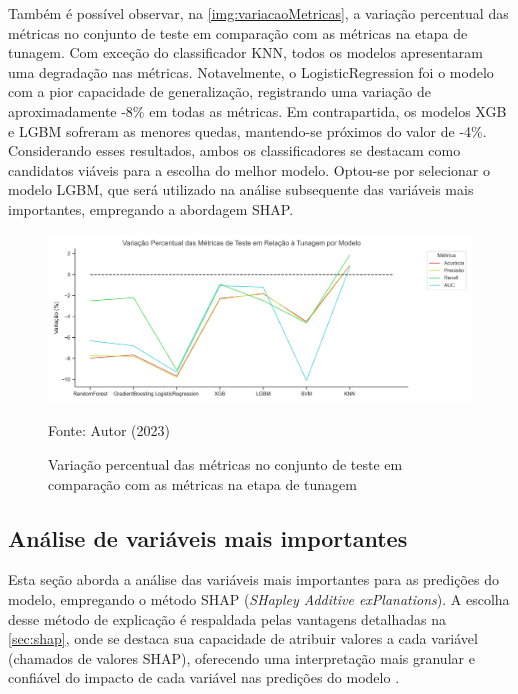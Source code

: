 Também é possível observar, na \autoref{img:variacaoMetricas}, a variação percentual das métricas no conjunto de teste em comparação com as métricas na etapa de tunagem. Com exceção do classificador KNN, todos os modelos apresentaram uma degradação nas métricas. Notavelmente, o LogisticRegression foi o modelo com a pior capacidade de generalização, registrando uma variação de aproximadamente -8\% em todas as métricas. Em contrapartida, os modelos XGB e LGBM sofreram as menores quedas, mantendo-se próximos do valor de -4\%. Considerando esses resultados, ambos os classificadores se destacam como candidatos viáveis para a escolha do melhor modelo. Optou-se por selecionar o modelo LGBM, que será utilizado na análise subsequente das variáveis mais importantes, empregando a abordagem SHAP.

\begin{figure}[H]
	\centering
	\caption{\label{img:variacaoMetricas}Variação percentual das métricas no conjunto de teste em comparação com as métricas na etapa de tunagem}
	\includegraphics[scale=0.7]{USPSC-img/variacao_pct_metricas_teste_por_modelo.png}
	\begin{center}
		Fonte: Autor (2023)
	\end{center}
\end{figure}

\subsection{Análise de variáveis mais importantes}

Esta seção aborda a análise das variáveis mais importantes para as predições do modelo, empregando o método SHAP (\textit{SHapley Additive exPlanations}). A escolha desse método de explicação é respaldada pelas vantagens detalhadas na \autoref{sec:shap}, onde se destaca sua capacidade de atribuir valores a cada variável (chamados de valores SHAP), oferecendo uma interpretação mais granular e confiável do impacto de cada variável nas predições do modelo \cite{Shap2017}.

